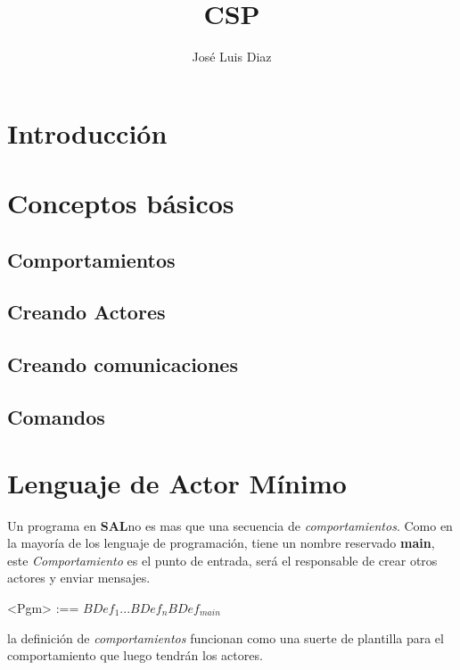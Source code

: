 \documentclass[fleqn]{article}
\title{CSP}
\author{José Luis Diaz}
\date{ }
\newcommand{\SAL}{\textbf{SAL}}
\begin{document}
 
\maketitle
 
\tableofcontents
 
\section{Introducción}

\section{Conceptos básicos}

\subsection{Comportamientos} \label{basicos:comportamientos}

\subsection{Creando Actores}

\subsection{Creando comunicaciones}

\subsection{Comandos}

\section{Lenguaje de Actor Mínimo}

Un programa en \SAL no es mas que una secuencia de \textit{comportamientos}.
Como en la mayoría de los lenguaje de programación, tiene un nombre reservado
\textbf{main}, este \textit{Comportamiento} es el punto de entrada, será el
responsable de crear otros actores y enviar mensajes.

\begin{grammar}
   <Pgm> :== $BDef_1 ... BDef_n BDef_{main} $ 
\end{grammar}

la definición de \textit{comportamientos} funcionan como una suerte de plantilla
para el comportamiento que luego tendrán los actores. 
\end{document}
